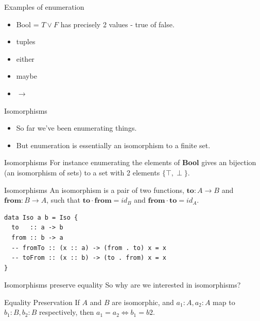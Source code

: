 \documentclass[tikz]{beamer}
\theoremstyle{definition}
\begin{document}
\begin{frame}{Examples of enumeration}

    \begin{itemize}
        \item Bool = $T \lor F$ has precisely 2 values - true of false.
	\item tuples
	\item either
	\item maybe
	\item $\to$
    \end{itemize}

\end{frame}{}

\begin{frame}{Isomorphisms}
	\begin{itemize}
	\item So far we've been enumerating things.
	\item But enumeration is essentially an isomorphism to a finite set.
	\end{itemize}
\end{frame}

\begin{frame}{Isomorphisms}
	For instance enumerating the elements of \textbf{Bool} gives an bijection (an isomorphism of sets) to a set with 2 elements $\{\top, \perp\}$.
\end{frame}

\begin{frame}[fragile]{Isomorphisms}
An isomorphism is a pair of two functions, $\mathbf{to}: A \to B$ and $\mathbf{from}: B \to A$, such that $\mathbf{to} \cdot \mathbf{from} = id_B$ and $\mathbf{from} \cdot \mathbf{to} = id_A$.

\begin{verbatim}
data Iso a b = Iso {
  to   :: a -> b
  from :: b -> a
  -- fromTo :: (x :: a) -> (from . to) x = x
  -- toFrom :: (x :: b) -> (to . from) x = x
}
\end{verbatim}
\end{frame}

\begin{frame}[fragile]{Isomorphisms preserve equality}
So why are we interested in isomorphisms?

\begin{block}{Equality Preservation}
    If $A$ and $B$ are isomorphic, and $a_1: A, a_2: A$ map to $b_1: B, b_2: B$ respectively, then $a_1 = a_2 \iff b_1 = b2$.
\end{block}
\end{frame}
\end{document}
